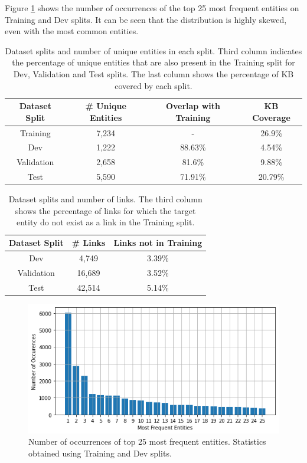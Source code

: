 \documentclass{report}
\theoremstyle{definition}
\theoremstyle{remark}
\begin{document}
Figure \ref{fig:entpopul} shows the number of occurrences of the top 25 most frequent entities on Training and Dev splits. It can be seen that the distribution is highly skewed, even with the most common entities. 

\begin{table}
    \centering
    \begin{tabular}{cccc}
    Dataset Split & \# Unique Entities & Overlap with Training & KB Coverage\\
    \hline
    Training & 7,234 & - & 26.9\%\\
    Dev & 1,222 & 88.63\% & 4.54\%\\
    Validation & 2,658 & 81.6\% & 9.88\%\\
    Test & 5,590 & 71.91\%& 20.79\%\\
    \end{tabular}
    \caption{Dataset splits and number of unique entities in each split. Third column indicates the percentage of unique entities that are also present in the Training split for Dev, Validation and Test splits. The last column shows the percentage of KB covered by each split.}
    \label{tab:goldstatsed2}
\end{table}

\begin{table}
    \centering
    \begin{tabular}{ccc}
    Dataset Split & \# Links & Links not in Training\\
    \hline
    Dev & 4,749 & 3.39\% \\
    Validation & 16,689 & 3.52\% \\
    Test & 42,514 & 5.14\% \\
    \end{tabular}
    \caption{Dataset splits and number of links. The third column shows the percentage of links for which the target entity do not exist as a link in the Training split.}
    \label{tab:goldstatsed3}
\end{table}

\begin{figure}
    \centering
    \includegraphics[scale=0.6]{ent_occ.png}
    \caption{Number of occurrences of top 25 most frequent entities. Statistics obtained using Training and Dev splits.}
    \label{fig:entpopul}
\end{figure}
\end{document}
